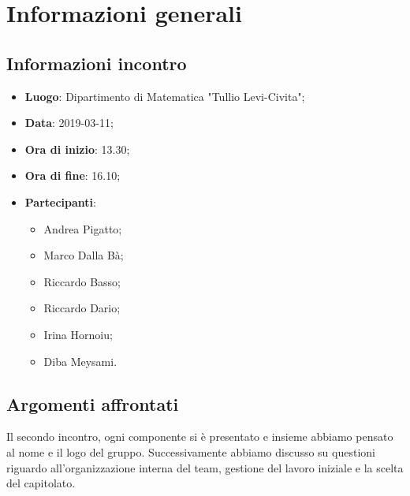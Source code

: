 \section{Informazioni generali}

\subsection{Informazioni incontro}
\begin{itemize}
\item \textbf{Luogo}: Dipartimento di Matematica "Tullio Levi-Civita";
\item \textbf{Data}: 2019-03-11;
\item \textbf{Ora di inizio}: 13.30;
\item \textbf{Ora di fine}: 16.10;
\item \textbf{Partecipanti}: 
\begin{itemize}
	\item Andrea Pigatto;
	\item Marco Dalla Bà;
	\item Riccardo Basso;
	\item Riccardo Dario;
	\item Irina Hornoiu;
	\item Diba Meysami.
\end{itemize}
\end{itemize}

\subsection{Argomenti affrontati}
Il secondo incontro, ogni componente si è presentato e insieme abbiamo pensato al nome e il logo del gruppo. 
Successivamente abbiamo discusso su questioni riguardo all'organizzazione interna del team, gestione del lavoro iniziale e la scelta del 
capitolato\glo{}.
